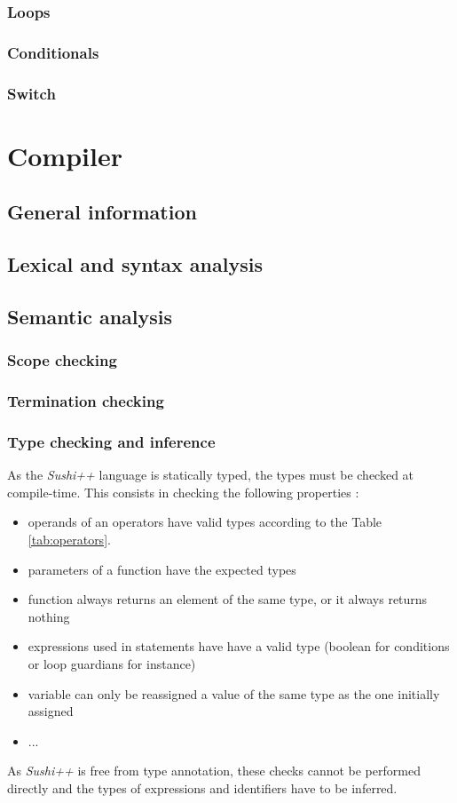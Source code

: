 \documentclass[a4paper,11pt]{article}
\begin{document}
\subsubsection{Loops}
\subsubsection{Conditionals}
\subsubsection{Switch}
\section{Compiler}
\label{sec:compiler}
\subsection{General information}
\subsection{Lexical and syntax analysis}
\subsection{Semantic analysis}
\subsubsection{Scope checking}
\subsubsection{Termination checking}
\subsubsection{Type checking and inference}
As the \textit{Sushi++} language is statically typed, the types must be checked at compile-time. This consists in checking the following properties :
\begin{itemize}
	\item operands of an operators have valid types according to the Table \ref{tab:operators}.
	\item parameters of a function have the expected types
	\item function always returns an element of the same type, or it always returns nothing
	\item expressions used in statements have have a valid type (boolean for conditions or loop guardians for instance)
	\item variable can only be reassigned a value of the same type as the one initially assigned
	\item ...
\end{itemize}
As \textit{Sushi++} is free from type annotation, these checks cannot be performed directly and the types of expressions and identifiers have to be inferred.
\end{document}
